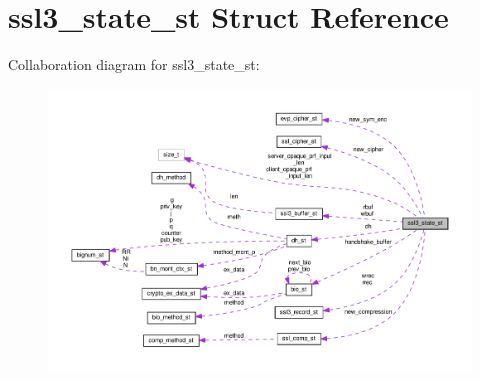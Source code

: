 \hypertarget{structssl3__state__st}{}\section{ssl3\+\_\+state\+\_\+st Struct Reference}
\label{structssl3__state__st}


Collaboration diagram for ssl3\+\_\+state\+\_\+st\+:
\nopagebreak
\begin{figure}[H]
\begin{center}
\leavevmode
\includegraphics[width=350pt]{structssl3__state__st__coll__graph}
\end{center}
\end{figure}
